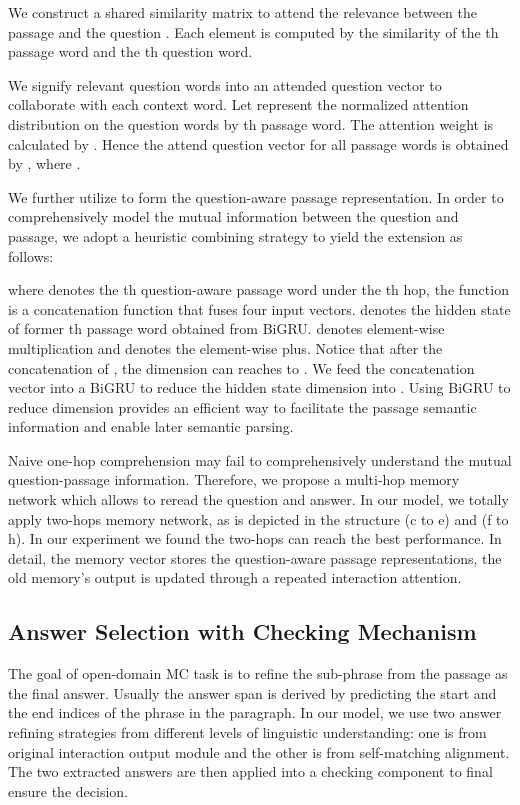 \documentclass[letterpaper]{article} \usepackage{aaai18}  \usepackage{times}  \usepackage{helvet}  \usepackage{courier}  \usepackage{url}  \usepackage{graphicx}  \usepackage{booktabs}
\begin{document}
 We construct a shared similarity matrix  to attend the relevance between the passage  and the question . Each element  is computed by the similarity of the th passage word and the th question word. 

 We signify relevant question words into an attended question vector to collaborate with each context word. Let  represent the normalized attention distribution on the question words by th passage word. The attention weight is calculated by . Hence the attend question vector for all passage words  is obtained by , where .

We further utilize  to form the question-aware passage representation. In order to comprehensively model the mutual information between the question and passage, we adopt a heuristic combining strategy to yield the extension as follows:

where  denotes the th question-aware passage word under the th hop, the  function is a concatenation function that fuses four input vectors.  denotes the hidden state of former th passage word obtained from BiGRU.  denotes element-wise multiplication and  denotes the element-wise plus. Notice that after the concatenation of , the dimension can reaches to . We feed the concatenation vector into a BiGRU to reduce the hidden state dimension into . Using BiGRU to reduce dimension provides an efficient way to facilitate the passage semantic information and enable later semantic parsing.

Naive one-hop comprehension may fail to comprehensively understand the mutual question-passage information. Therefore, we propose a multi-hop memory network which allows to reread the question and answer. In our model, we totally apply two-hops memory network, as is depicted in the structure (c to e) and (f to h). In our experiment we found the two-hops can reach the best performance. In detail, the memory vector stores the question-aware passage representations, the old memory's output is updated through a repeated interaction attention. 
\subsection{Answer Selection with Checking Mechanism}
The goal of open-domain MC task is to refine the sub-phrase from the passage as the final answer. Usually the answer span  is derived by predicting the start  and the end  indices of the phrase in the paragraph. In our model, we use two answer refining strategies from different levels of linguistic understanding: one is from original interaction output module and the other is from self-matching alignment. The two extracted answers are then applied into a checking component to final ensure the decision.
\end{document}
